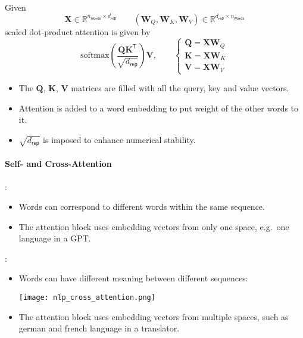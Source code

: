 \begin{examplesection}
    Given
    \noindent\begin{equation*}
        \mathbf{X}\in \mathbb{R}^{n_{\mathsf{words}} \times d_{\mathsf{rep}}}\qquad (\mathbf{W}_Q, \mathbf{W}_K, \mathbf{W}_V)\in \mathbb{R}^{d_{\mathsf{rep}}\times n_{\mathsf{words}}}
    \end{equation*}
    scaled dot-product attention is given by
    \noindent\begin{equation*}
        \mathrm{softmax}\left(\frac{\mathbf{QK}^{\mathsf{T}}}{\sqrt{d_{\mathsf{rep}}}}\right) \mathbf{V},\qquad
        \begin{cases}
            \mathbf{Q} = \mathbf{XW}_Q \\
            \mathbf{K} = \mathbf{XW}_K \\
            \mathbf{V} = \mathbf{XW}_V
        \end{cases}
    \end{equation*}
    \newpar{}
    \begin{itemize}
        \item The $\mathbf{Q}$, $\mathbf{K}$, $\mathbf{V}$ matrices are filled with all the query, key and value vectors. 
        \item Attention is added to a word embedding to put weight of the other words to it.
        \item $\sqrt{d_{\mathsf{rep}}}$ is imposed to enhance numerical stability.
    \end{itemize}
\end{examplesection}

\paragraph{Self- and Cross-Attention}

:

\begin{itemize}
    \item Words can correspond to different words within the same sequence. 
    \item The attention block uses embedding vectors from only one space, e.g.\ one language in a GPT.
\end{itemize}

\newpar{}
:

\begin{itemize}
    \item Words can have different meaning between different sequences:
    \begin{center}
        \texttt{[image: nlp\_cross\_attention.png]}
    \end{center}
    \item The attention block uses embedding vectors from multiple spaces, such as german and french language in a translator.
\end{itemize}

